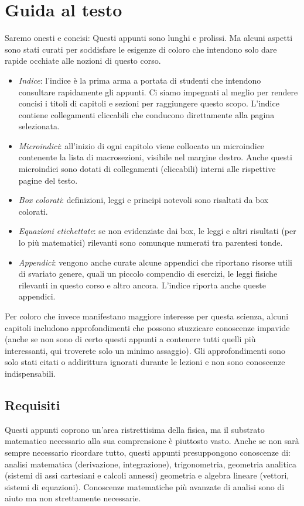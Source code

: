 \chapter*{Guida al testo}
Saremo onesti e concisi: Questi appunti sono lunghi e prolissi.
Ma alcuni aspetti sono
stati curati per soddisfare le esigenze di coloro che intendono solo dare rapide
occhiate alle nozioni di questo corso.

\begin{itemize}
    \item \textit{Indice}: l'indice è la prima arma a portata di studenti che intendono
    consultare rapidamente gli appunti. Ci siamo impegnati al meglio per rendere
    concisi i titoli di capitoli e sezioni per raggiungere questo scopo. L'indice
    contiene collegamenti cliccabili che conducono direttamente alla pagina selezionata.

    \item \textit{Microindici}: all'inizio di ogni capitolo viene collocato un microindice
    contenente la lista di macrosezioni, visibile nel margine destro. Anche questi microindici sono dotati di
    collegamenti (cliccabili) interni alle rispettive pagine del testo.

    \item \textit{Box colorati}: definizioni, leggi e principi notevoli sono risaltati
    da box colorati.
    
    \item \textit{Equazioni etichettate}: se non evidenziate dai box, le leggi e altri
    risultati (per lo più matematici) rilevanti sono comunque numerati tra
    parentesi tonde.

    \item \textit{Appendici}: vengono anche curate alcune appendici che riportano risorse
    utili di svariato genere, quali un piccolo compendio di esercizi, le leggi
    fisiche rilevanti in questo corso e altro ancora. L'indice riporta anche
    queste appendici.
\end{itemize}

Per coloro che invece manifestano maggiore interesse per questa scienza, alcuni
capitoli includono approfondimenti che possono stuzzicare conoscenze impavide (anche
se non sono di certo questi appunti a contenere tutti quelli più interessanti,
qui troverete solo un minimo assaggio).
Gli approfondimenti sono solo stati citati o addirittura ignorati durante
le lezioni e non sono conoscenze indispensabili.

\section*{Requisiti}
Questi appunti coprono un'area ristrettisima della fisica, ma il substrato
matematico necessario alla sua comprensione è piuttosto vasto. Anche
se non sarà sempre necessario ricordare tutto,
questi appunti presuppongono conoscenze di: analisi matematica (derivazione,
integrazione), trigonometria, geometria analitica (sistemi di assi
cartesiani e calcoli annessi) geometria e algebra lineare (vettori,
sistemi di equazioni). Conoscenze matematiche più avanzate di analisi
sono di aiuto ma non strettamente necessarie.


